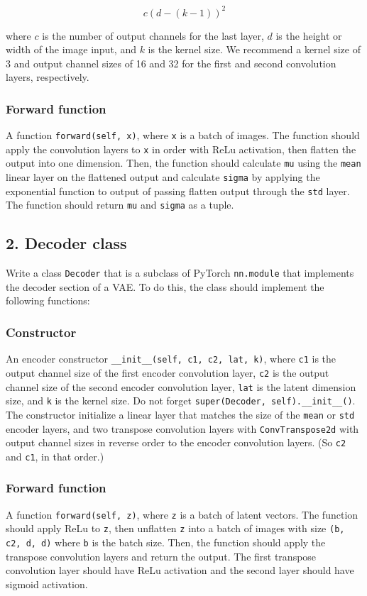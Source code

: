 \documentclass{article}
\begin{document}
\[c(d - (k - 1)) ^ 2\]

where $c$ is the number of output channels for the last layer, $d$ is the height or width of the image input, and $k$ is the kernel size. We recommend a kernel size of 3 and output channel sizes of 16 and 32 for the first and second convolution layers, respectively.

\subsubsection*{Forward function}
A function \texttt{forward(self, x)}, where \texttt{x} is a batch of images. The function should apply the convolution layers to \texttt{x} in order with ReLu activation, then flatten the output into one dimension. Then, the function should calculate \texttt{mu} using the \texttt{mean} linear layer on the flattened output and calculate \texttt{sigma} by applying the exponential function to output of passing flatten output through the \texttt{std} layer. The function should return \texttt{mu} and \texttt{sigma} as a tuple. 

\subsection*{2. Decoder class}
Write a class \texttt{Decoder} that is a subclass of PyTorch \texttt{nn.module} that implements the decoder section of a VAE. To do this, the class should implement the following functions:
\subsubsection*{Constructor}
An encoder constructor \texttt{\_\_init\_\_(self, c1, c2, lat, k)}, where \texttt{c1} is the output channel size of the first encoder convolution layer, \texttt{c2} is the output channel size of the second encoder convolution layer, \texttt{lat} is the latent dimension size, and \texttt{k} is the kernel size. Do not forget \texttt{super(Decoder, self).\_\_init\_\_()}. The constructor initialize a linear layer that matches the size of the \texttt{mean} or \texttt{std} encoder layers, and two transpose convolution layers with \texttt{ConvTranspose2d} with output channel sizes in reverse order to the encoder convolution layers. (So \texttt{c2} and \texttt{c1}, in that order.)

\subsubsection*{Forward function}
A function \texttt{forward(self, z)}, where \texttt{z} is a batch of latent vectors. The function should apply ReLu to \texttt{z}, then unflatten \texttt{z} into a batch of images with size \texttt{(b, c2, d, d)} where \texttt{b} is the batch size. Then, the function should apply the transpose convolution layers and return the output. The first transpose convolution layer should have ReLu activation and the second layer should have sigmoid activation.
\end{document}
